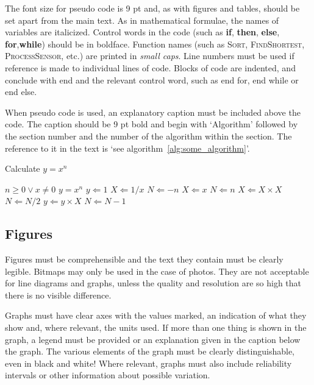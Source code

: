 The font size for pseudo code is 9 pt and, as with figures and tables, should be set apart from the main text.
As in mathematical formulae, the names of  variables are italicized.
Control words in the code (such as \textbf{if}, \textbf{then}, \textbf{else}, \textbf{for},\textbf{while}) should be in boldface.
Function names (such as \textsc{Sort}, \textsc{FindShortest}, \textsc{ProcessSensor}, etc.) are printed in \emph{small caps}.
Line numbers must be used if reference is made to individual lines of code.
Blocks of code are indented, and conclude with end and the relevant control word, such as end for, end while or end else.

When pseudo code is used, an explanatory caption must be included above the code.
The caption should be 9 pt bold and begin with `Algorithm' followed by the section number and the number of the algorithm within the section.
The reference to it in the text is `see algorithm~\ref{alg:some_algorithm}'.

\begin{algorithm}[h]
\caption{Calculate $y = x^n$}\label{alg:some_algorithm}
\begin{algorithmic}
\REQUIRE $n \geq 0 \vee x \neq 0$
\ENSURE $y = x^n$
\STATE $y \Leftarrow 1$
\STATE $X \Leftarrow 1 / x$
\STATE $N \Leftarrow -n$
\ELSE
\STATE $X \Leftarrow x$
\STATE $N \Leftarrow n$
\ENDIF
{}
\STATE $X \Leftarrow X \times X$
\STATE $N \Leftarrow N / 2$
\ELSE[$N$ is odd]
\STATE $y \Leftarrow y \times X$
\STATE $N \Leftarrow N - 1$
\ENDIF
\ENDWHILE
\end{algorithmic}
\end{algorithm}

\subsection{Figures}\label{sec:_figures}
Figures must be comprehensible and the text they contain must be clearly legible.
Bitmaps may only be used in the case of photos.
They are not acceptable for line diagrams and graphs, unless the quality and resolution are so high that there is no visible difference.

Graphs must have clear axes with the values marked, an indication of what they show and, where relevant, the units used.
If more than one thing is shown in the graph, a legend must be provided or an explanation given in the caption below the graph.
The various elements of the graph must be clearly distinguishable, even in black and white! Where relevant, graphs must also include reliability intervals or other information about possible variation.

